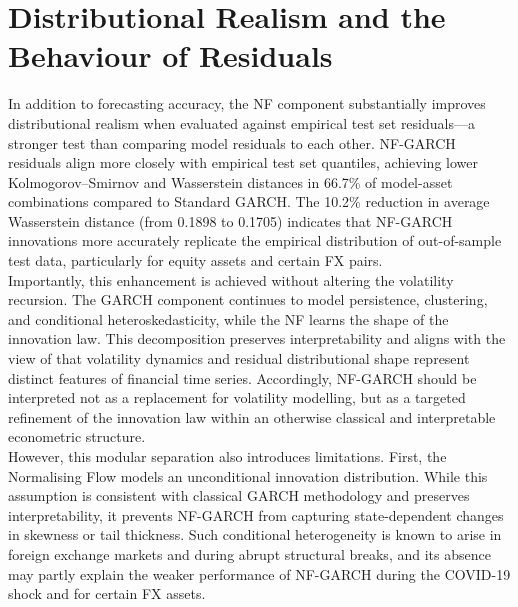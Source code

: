 \documentclass[oneside,12pt]{CUEDthesisPSnPDF}
\newcommand{\textcite}{\citet}
\begin{document}
\section{Distributional Realism and the Behaviour of Residuals}

\noindent
In addition to forecasting accuracy, the NF component substantially improves distributional realism when evaluated against empirical test set residuals---a stronger test than comparing model residuals to each other. NF-GARCH residuals align more closely with empirical test set quantiles, achieving lower Kolmogorov–Smirnov and Wasserstein distances in 66.7\% of model-asset combinations compared to Standard GARCH. The 10.2\% reduction in average Wasserstein distance (from 0.1898 to 0.1705) indicates that NF-GARCH innovations more accurately replicate the empirical distribution of out-of-sample test data, particularly for equity assets and certain FX pairs.\\

Importantly, this enhancement is achieved without altering the volatility recursion. The GARCH component continues to model persistence, clustering, and conditional heteroskedasticity, while the NF learns the shape of the innovation law. This decomposition preserves interpretability and aligns with the view of \textcite{cont2001empirical} that volatility dynamics and residual distributional shape represent distinct features of financial time series. Accordingly, NF-GARCH should be interpreted not as a replacement for volatility modelling, but as a targeted refinement of the innovation law within an otherwise classical and interpretable econometric structure.\\

However, this modular separation also introduces limitations. First, the Normalising Flow models an unconditional innovation distribution. While this assumption is consistent with classical GARCH methodology and preserves interpretability, it prevents NF-GARCH from capturing state-dependent changes in skewness or tail thickness. Such conditional heterogeneity is known to arise in foreign exchange markets and during abrupt structural breaks, and its absence may partly explain the weaker performance of NF-GARCH during the COVID-19 shock and for certain FX assets.\\
\end{document}

